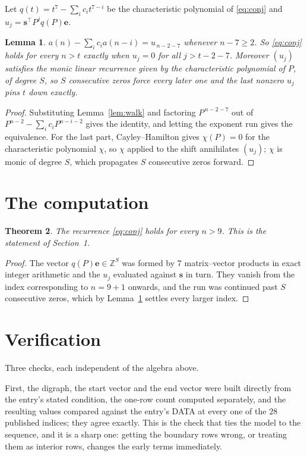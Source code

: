 \documentclass[11pt,a4paper]{article}
\theoremstyle{plain}
\newtheorem{theorem}{Theorem}
\newtheorem{lemma}[theorem]{Lemma}
\theoremstyle{definition}
\begin{document}
Let $q(t)=t^{7}-\sum_i c_i t^{7-i}$ be the characteristic polynomial of
\eqref{eq:conj} and $u_j=\mathbf{s}^{\!\top}P^{j}q(P)\mathbf{e}$.

\begin{lemma}\label{lem:crit}
$a(n)-\sum_i c_i a(n-i)=u_{\,n-2-7}$ whenever $n-7\ge2$. So \eqref{eq:conj}
holds for every $n>t$ exactly when $u_j=0$ for all $j>t-2-7$. Moreover $(u_j)$
satisfies the monic linear recurrence given by the characteristic polynomial of $P$, of
degree $S$, so $S$ consecutive zeros force every later one and the last nonzero $u_j$ pins
$t$ down exactly.
\end{lemma}

\begin{proof}
Substituting Lemma~\ref{lem:walk} and factoring $P^{\,n-2-7}$ out of
$P^{n-2}-\sum_i c_i P^{n-i-2}$ gives the identity, and letting the exponent run gives the
equivalence. For the last part, Cayley--Hamilton gives $\chi(P)=0$ for the characteristic
polynomial $\chi$, so $\chi$ applied to the shift annihilates $(u_j)$; $\chi$ is monic of
degree $S$, which propagates $S$ consecutive zeros forward.
\end{proof}

\section{The computation}

\begin{theorem}
The recurrence \eqref{eq:conj} holds for every $n>9$. This is the statement of
Section~1.
\end{theorem}

\begin{proof}
The vector $q(P)\mathbf{e}\in\mathbb{Z}^{S}$ was formed by $7$ matrix--vector
products in exact integer arithmetic and the $u_j$ evaluated against $\mathbf{s}$ in turn.
They vanish from the index corresponding to $n=9+1$ onwards, and the run was continued
past $S$ consecutive zeros, which by Lemma~\ref{lem:crit} settles every larger index.
\end{proof}

\section{Verification}

Three checks, each independent of the algebra above.

First, the digraph, the start vector and the end vector were built directly from the
entry's stated condition, the one-row count computed separately, and the resulting values
compared against the entry's DATA at every one of the $28$ published indices; they
agree exactly. This is the check that ties the model to the sequence, and it is a sharp one:
getting the boundary rows wrong, or treating them as interior rows, changes the early terms
immediately.
\end{document}
